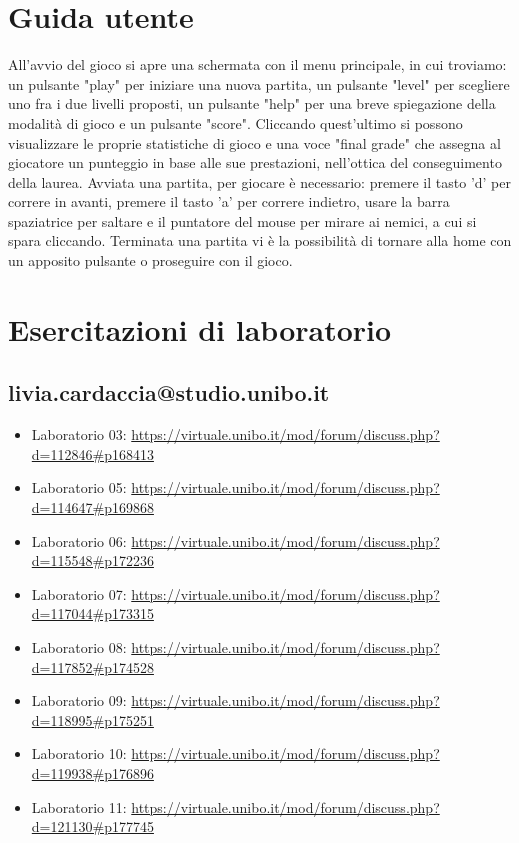 \documentclass[a4paper,12pt]{report}
\begin{document}
\newpage
\chapter{Guida utente}
All'avvio del gioco si apre una schermata con il menu principale, in cui troviamo: un pulsante "play" per iniziare una nuova partita, un pulsante "level" per scegliere uno fra i due livelli proposti, un pulsante "help" per una breve spiegazione della modalità di gioco e un pulsante "score".
Cliccando quest'ultimo si possono visualizzare le proprie statistiche di gioco e una voce "final grade" che assegna al giocatore un punteggio in base alle sue prestazioni, nell'ottica del conseguimento della laurea.
Avviata una partita, per giocare è necessario: premere il tasto 'd' per correre in avanti, premere il tasto 'a' per correre indietro, usare la barra spaziatrice per saltare e il puntatore del mouse per mirare ai nemici, a cui si spara cliccando.
Terminata una partita vi è la possibilità di tornare alla home con un apposito pulsante o proseguire con il gioco.
\chapter{Esercitazioni di laboratorio}
\section{livia.cardaccia@studio.unibo.it}
\begin{itemize}
\item Laboratorio 03: \url{https://virtuale.unibo.it/mod/forum/discuss.php?d=112846\#p168413}
\item Laboratorio 05: \url{https://virtuale.unibo.it/mod/forum/discuss.php?d=114647\#p169868}
\item Laboratorio 06: \url{https://virtuale.unibo.it/mod/forum/discuss.php?d=115548\#p172236}
\item Laboratorio 07: \url{https://virtuale.unibo.it/mod/forum/discuss.php?d=117044\#p173315}
\item Laboratorio 08: \url{https://virtuale.unibo.it/mod/forum/discuss.php?d=117852\#p174528}
\item Laboratorio 09: \url{https://virtuale.unibo.it/mod/forum/discuss.php?d=118995\#p175251}
\item Laboratorio 10: \url{https://virtuale.unibo.it/mod/forum/discuss.php?d=119938\#p176896}
\item Laboratorio 11: \url{https://virtuale.unibo.it/mod/forum/discuss.php?d=121130\#p177745}
\end{itemize}
\end{document}
